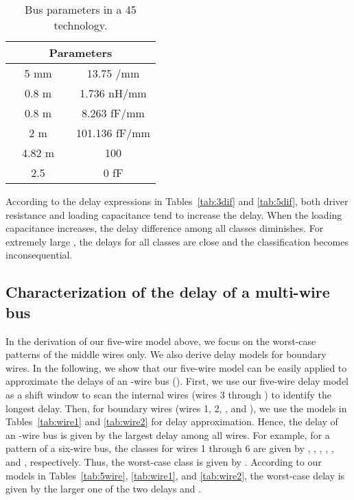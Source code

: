 \documentclass[10pt,journal]{IEEEtran}
\begin{document}
\begin{table}[!t]
\caption{Bus parameters in a 45 technology.} \label{tab:parameter}
\begin{center}
\begin{tabular}{|c|c||c|c|}
\hline
\multicolumn{4}{|c|}{Parameters} \\
\hline
 & 5 mm &  & 13.75 /mm \\
\hline
 & 0.8 m &  & 1.736 nH/mm \\
\hline
 & 0.8 m &  & 8.263 fF/mm \\
\hline
 & 2 m &  & 101.136 fF/mm \\
\hline
 & 4.82 m &  & 100  \\
\hline
 & 2.5 &  & 0 fF \\
\hline
\end{tabular}
\end{center}
\end{table}

According to the delay expressions in Tables~\ref{tab:3dif} and \ref{tab:5dif}, both driver resistance and loading capacitance tend to increase the delay. When the loading capacitance increases, the delay difference among all classes diminishes. For extremely large , the delays for all classes are close and the classification becomes inconsequential.






\subsection{Characterization of the delay of a multi-wire bus}
\label{sec:application}


In the derivation of our five-wire model above, we focus on the worst-case patterns of the middle wires only.
We also derive delay models for boundary wires. In the following, we show that our five-wire model can be easily applied to approximate the delays of an -wire bus ().
First, we use our five-wire delay model as a shift window to scan the internal wires (wires 3 through ) to identify the longest delay.
Then, for boundary wires (wires 1, 2, , and ), we use the models in Tables~\ref{tab:wire1} and \ref{tab:wire2} for delay approximation. Hence, the delay of an -wire bus is given by the largest delay among all wires.
For example, for a pattern  of a six-wire bus, the classes for wires 1 through 6 are given by , , , , , and , respectively. Thus, the worst-case class is given by . According to our models in Tables~\ref{tab:5wire}, \ref{tab:wire1}, and \ref{tab:wire2}, the worst-case delay is given by the larger one of the two delays  and .
\end{document}
